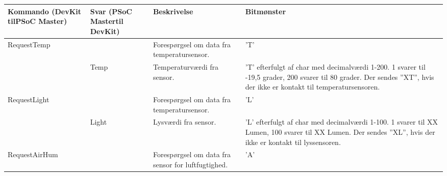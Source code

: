 \begin{longtable}{| L{2.5cm} | L{2.3cm} | L{4cm} | >{\raggedright\arraybackslash}X |}
	\hline
    Kommando \newline (DevKit til\newline PSoC Master)  & Svar \newline (PSoC Master\newline til DevKit)  & Beskrivelse                                         & Bitmønster                                                                                                                                                                                                                                    \\ \hline
    RequestTemp                       & ~                             & Forespørgsel om data fra temperatursensor.          & ’T’                                                                                                                                                                                                                                           \\ \hline
    ~                                 & Temp                          & Temperaturværdi fra sensor.                         & ’T’ efterfulgt af char med decimalværdi 1-200. 1 svarer til -19,5 grader, 200 svarer til 80 grader. Der sendes ”XT”, hvis der ikke er kontakt til temperatursensoren.                                                                       \\ \hline
    RequestLight                      & ~                             & Forespørgsel om data fra temperatursensor.          & ’L’                                                                                                                                                                                                                                            \\ \hline
    ~                                 & Light                         & Lysværdi fra sensor.                                & ’L’ efterfulgt af char med decimalværdi 1-100. 1 svarer til XX Lumen, 100 svarer til XX Lumen. Der sendes ”XL”, hvis der ikke er kontakt til lyssensoren.                                                                                   \\ \hline
    RequestAirHum                     & ~                             & Forespørgsel om data fra sensor for luftfugtighed.  & ’A’                                                                                                                                                                                                                                           \\ \hline

\end{longtable}
